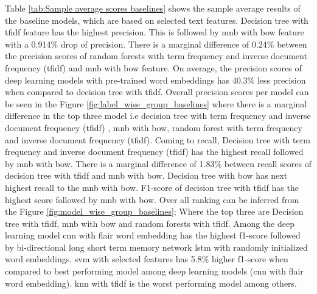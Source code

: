 Table \ref{tab:Sample average scores baselines} shows the sample average results of the baseline models, which are based on selected text features. Decision tree with \acrfull{tfidf} feature has the highest precision. This is followed by \acrfull{mnb} with \acrfull{bow} feature with a 0.914\% drop of precision. There is a marginal difference of 0.24\% between the precision scores of random forests with term frequency and inverse document frequency (\acrshort{tfidf}) and \acrfull{mnb} with \acrfull{bow} feature. On average, the precision scores of deep learning models with pre-trained word embeddings has 40.3\% less precision when compared to decision tree with \acrshort{tfidf}. Overall precision scores per model can be seen in the Figure \ref{fig:label_wise_group_baselines} where there is a marginal difference in the top three model i.e decision tree with term frequency and inverse document frequency (\acrshort{tfidf}) , \acrfull{mnb} with  \acrfull{bow}, random forest with term frequency and inverse document frequency (\acrshort{tfidf}). Coming to recall, Decision tree with term frequency and inverse document frequency (\acrshort{tfidf}) has the highest recall followed by \acrfull{mnb} with \acrfull{bow}. There is a marginal difference of 1.83\% between recall scores of decision tree with \acrshort{tfidf} and \acrfull{mnb} with \acrfull{bow}. Decision tree with \acrfull{bow} has next highest recall to the \acrfull{mnb} with \acrfull{bow}. F1-score of decision tree with \acrshort{tfidf} has the highest score followed by \acrfull{mnb} with \acrfull{bow}. Over all ranking can be inferred from the Figure \ref{fig:model_wise_group_baselines}; Where the top three are Decision tree with \acrshort{tfidf}, \acrshort{mnb} with \acrshort{bow} and random forests with \acrshort{tfidf}. Among the deep learning model \acrshort{cnn} with flair word embedding has the highest f1-score followed by bi-directional long short term memory network \acrshort{lstm} with randomly initialized word embeddings. \acrfull{svm} with selected features has 5.8\% higher f1-score when compared to best performing model among deep learning models (\acrshort{cnn} with flair word embedding). \acrshort{knn} with \acrshort{tfidf} is the worst performing model among others.

